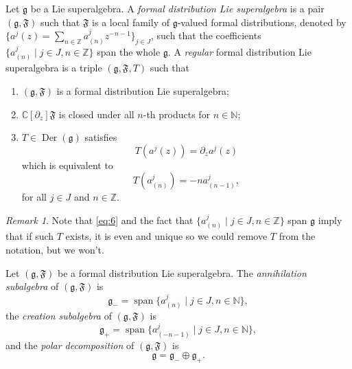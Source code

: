 \documentclass[a4paper, 12pt, reqno]{amsart}
\theoremstyle{remark}
\newtheorem{remark}[theorem]{Remark}
\numberwithin{equation}{subsection}
\DeclareMathOperator{\vspan}{span}
\DeclareMathOperator{\Der}{Der}
\begin{document}
Let $\mathfrak{g}$ be a Lie superalgebra.
A \emph{formal distribution Lie superalgebra} is a pair $(\mathfrak{g}, \mathfrak{F})$ such that $\mathfrak{F}$ is a local family of $\mathfrak{g}$-valued formal distributions, denoted by $\{a^j(z) = \sum_{n \in \mathbb{Z}}a^j_{(n)}z^{-n - 1}\}_{j \in J}$, such that the coefficients $\{a^j_{(n)} \mid j \in J, n \in \mathbb{Z}\}$ span the whole $\mathfrak{g}$.
A \emph{regular} formal distribution Lie superalgebra is a triple $(\mathfrak{g}, \mathfrak{F}, T)$ such that
\begin{enumerate}
\item $(\mathfrak{g}, \mathfrak{F})$ is a formal distribution Lie superalgebra;
\item $\mathbb{C}[\partial_z]\mathfrak{F}$ is closed under all $n$-th products for $n \in \mathbb{N}$;
\item $T \in \Der(\mathfrak{g})$ satisfies
  \begin{equation*}
    T(a^j(z)) = \partial_za^j(z)
  \end{equation*}
  which is equivalent to
  \begin{equation}
    \label{eq:6}
    T(a^j_{(n)}) = -na^j_{(n - 1)},
  \end{equation}
  for all $j \in J$ and $n \in \mathbb{Z}$. 
\end{enumerate}
\begin{remark}
  \label{rmk:4}
  Note that \eqref{eq:6} and the fact that $\{a^j_{(n)} \mid j \in J, n \in \mathbb{Z}\}$ span $\mathfrak{g}$ imply that if such $T$ exists, it is even and unique so we could remove $T$ from the notation, but we won't.
\end{remark}

Let $(\mathfrak{g}, \mathfrak{F})$ be a formal distribution Lie superalgebra.
The \emph{annihilation subalgebra} of $(\mathfrak{g}, \mathfrak{F})$ is
\begin{equation*}
  \mathfrak{g}_- = \vspan\{a^j_{(n)} \mid j \in J, n \in \mathbb{N}\},
\end{equation*}
the \emph{creation subalgebra} of $(\mathfrak{g}, \mathfrak{F})$ is
\begin{equation*}
  \mathfrak{g}_+ = \vspan\{a^j_{(-n - 1)} \mid j \in J, n \in \mathbb{N}\},
\end{equation*}
and the \emph{polar decomposition} of $(\mathfrak{g}, \mathfrak{F})$ is
\begin{equation*}
  \mathfrak{g} = \mathfrak{g}_- \oplus \mathfrak{g}_+.
\end{equation*}
\end{document}
